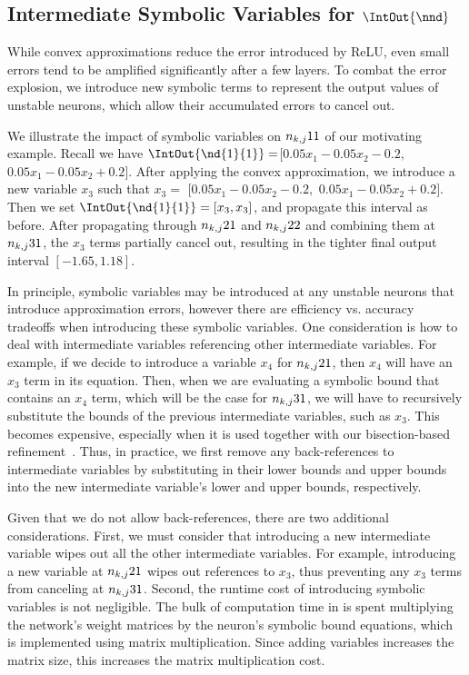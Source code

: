 \subsection{Intermediate Symbolic Variables for $\IntOut{\nnd}$}
\label{neurodiff:sec:symbolic}


While convex approximations reduce the error introduced by ReLU, even
small errors tend to be amplified significantly after a few layers.
To combat the error explosion, we introduce new symbolic terms to represent the
output values of unstable neurons, which allow their accumulated
errors to cancel out.


We illustrate the impact of symbolic variables on $ n_{k,j}{1}{1} $ of our
motivating example. Recall we have $ \IntOut{\nd{1}{1}} =$$ [0.05x_1 -
0.05x_2 - 0.2,$ $ 0.05x_1 - 0.05x_2 + 0.2] $. After applying the
convex approximation, we introduce a new variable $ x_3$
such that $ x_3 = $ $ [0.05x_1 - 0.05x_2 - 0.2, $ $
0.05x_1 - 0.05x_2 + 0.2 ]$.
Then we set $ \IntOut{\nd{1}{1}} = [x_3, x_3] $, and
propagate this interval as before. After propagating through
$ n_{k,j}{2}{1} $ and $ n_{k,j}{2}{2} $ and combining them at $ n_{k,j}{3}{1} $, the
$ x_3 $ terms partially cancel out, resulting in the tighter final
output interval $ [-1.65, 1.18] $.

In principle, symbolic variables may be introduced at any unstable
neurons that introduce approximation errors,
however there are efficiency vs. accuracy tradeoffs when
introducing these symbolic variables.  One consideration
is how to deal with intermediate variables referencing other
intermediate variables. For example, if we decide to introduce a
variable $ x_4 $ for $ n_{k,j}{2}{1} $, then $ x_4 $ will have an $ x_3 $
term in its equation. Then, when we are evaluating a symbolic bound that
contains
an $ x_4 $ term, which will be the case for $ n_{k,j}{3}{1} $, we will have to
recursively substitute the bounds of the
previous intermediate variables, such as $ x_3 $. This becomes expensive,
especially when it is used together with our bisection-based
refinement~\cite{WangPWYJ18,paulsen2020reludiff}.
%
Thus, in practice, we first remove any back-references to intermediate
variables by substituting in their lower bounds and upper bounds into the
new intermediate variable's lower and upper bounds, respectively.

Given that we do not allow back-references, there are two
additional considerations.
%
First, we must consider that introducing a new intermediate
variable wipes out all the other intermediate variables.  For
example, introducing a new variable at $ n_{k,j}{2}{1} $ wipes out references
to $ x_3 $, thus preventing any $ x_3 $ terms from canceling at $ n_{k,j}{3}{1} $.
%
Second, the runtime cost of introducing symbolic variables is not
negligible. The bulk of computation time in \Name{} is spent
multiplying the network's weight matrices by the neuron's symbolic
bound equations, which is implemented using matrix multiplication. Since adding
variables increases the matrix size, this increases the matrix
multiplication cost.

